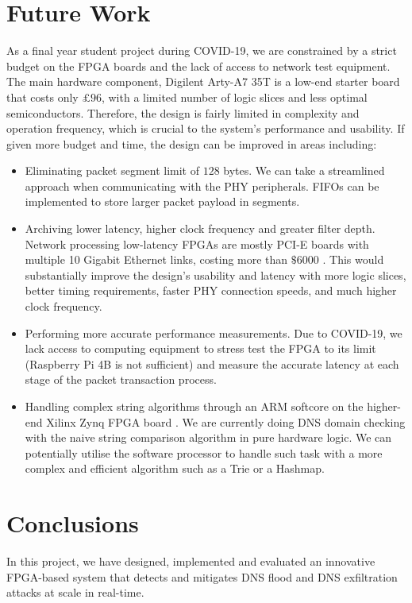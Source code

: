 \documentclass[a4paper]{report}
\begin{document}
\section{Future Work}

As a final year student project during COVID-19, we are constrained by a strict budget on the FPGA boards and the lack of access to network test equipment. The main hardware component, Digilent Arty-A7 35T is a low-end starter board that costs only $£96$, with a limited number of logic slices and less optimal semiconductors. Therefore, the design is fairly limited in complexity and operation frequency, which is crucial to the system's performance and usability. If given more budget and time, the design can be improved in areas including:

\begin{itemize}
    \item Eliminating packet segment limit of $128$ bytes. We can take a streamlined approach when communicating with the PHY peripherals. FIFOs can be implemented to store larger packet payload in segments.
    \item Archiving lower latency, higher clock frequency and greater filter depth. Network processing low-latency FPGAs are mostly PCI-E boards with multiple 10 Gigabit Ethernet links, costing more than $\$6000$ \cite{netfpga-sume-digilent}. This would substantially improve the design's usability and latency with more logic slices, better timing requirements, faster PHY connection speeds, and much higher clock frequency.
    \item Performing more accurate performance measurements. Due to COVID-19, we lack access to computing equipment to stress test the FPGA to its limit (Raspberry Pi 4B is not sufficient) and measure the accurate latency at each stage of the packet transaction process.
    \item Handling complex string algorithms through an ARM softcore on the higher-end Xilinx Zynq FPGA board \cite{zynq-7000-xilinx}. We are currently doing DNS domain checking with the naive string comparison algorithm in pure hardware logic. We can potentially utilise the software processor to handle such task with a more complex and efficient algorithm such as a Trie or a Hashmap.
\end{itemize}

\section{Conclusions}
In this project, we have designed, implemented and evaluated an innovative FPGA-based system that detects and mitigates DNS flood and DNS exfiltration attacks at scale in real-time.
\end{document}
